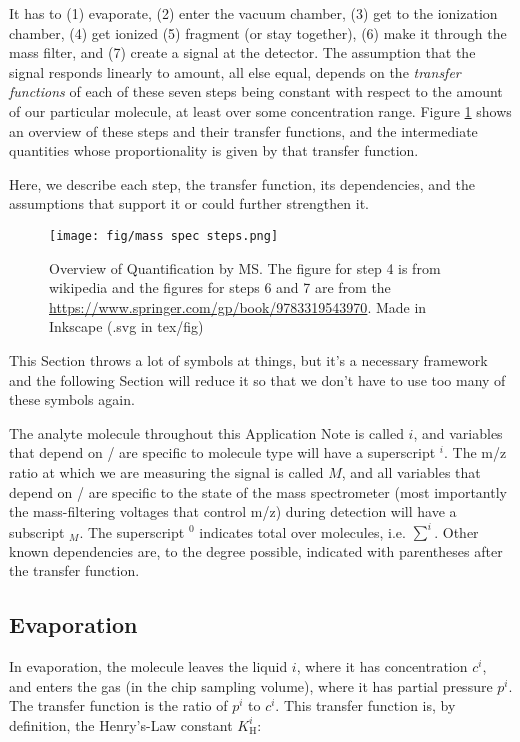 \documentclass{article}
\begin{document}
It has to (1) evaporate, (2) enter the vacuum chamber, (3) get to the ionization chamber, (4) get ionized (5) fragment (or stay together), (6) make it through the mass filter, and (7) create a signal at the detector. The assumption that the signal responds linearly to amount, all else equal, depends on the \textit{transfer functions} of each of these seven steps being constant with respect to the amount of our particular molecule, at least over some concentration range. Figure \ref{fig:steps} shows an overview of these steps and their transfer functions, and the intermediate quantities whose proportionality is given by that transfer function.

Here, we describe each step, the transfer function, its dependencies, and the assumptions that support it or could further strengthen it.

\begin{figure}
	\centering
	\texttt{[image: fig/mass spec steps.png]}
	\caption{Overview of Quantification by MS. The figure for step 4 is from wikipedia and the figures for steps 6 and 7 are from the \href{Mass Spectrometry textbook}{https://www.springer.com/gp/book/9783319543970}. Made in Inkscape (.svg in tex/fig)}
	\label{fig:steps}
\end{figure}

This Section throws a lot of symbols at things, but it's a necessary framework and the following Section will reduce it so that we don't have to use too many of these symbols again. 

The analyte molecule throughout this Application Note is called $i$, and variables that depend on / are specific to molecule type will have a superscript $^i$. The m/z ratio at which we are measuring the signal is called $M$, and all variables that depend on / are specific to the state of the mass spectrometer (most importantly the mass-filtering voltages that control m/z) during detection will have a subscript $_M$. The superscript $^0$ indicates total over molecules, i.e. $\sum^i$. Other known dependencies are, to the degree possible, indicated with parentheses after the transfer function. 

\subsection{Evaporation}

In evaporation, the molecule leaves the liquid $i$, where it has concentration $c^i$, and enters the gas (in the chip sampling volume), where it has partial pressure $p^i$. The transfer function is the ratio of $p^i$ to $c^i$. This transfer function is, by definition, the Henry's-Law constant $K_\text{H}^i$:
\end{document}
